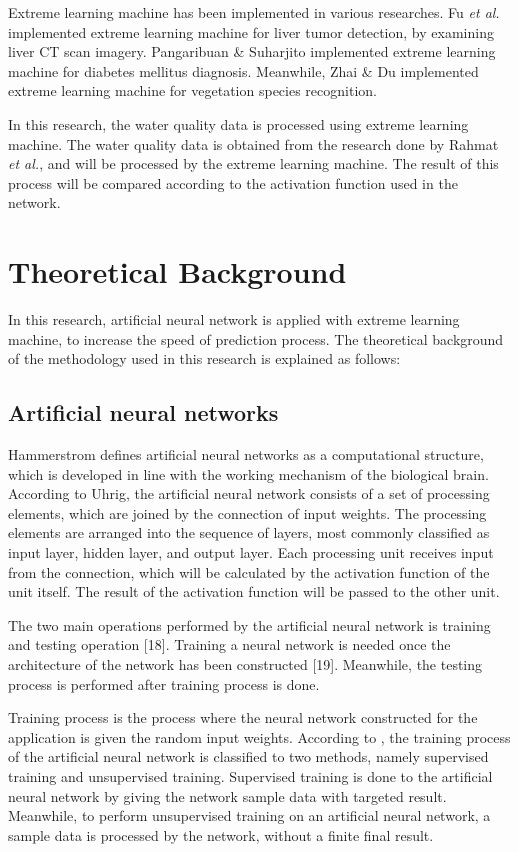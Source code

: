 \documentclass{ws-ijait}
\begin{document}
Extreme learning machine has been implemented in various researches. Fu \textit{et al.}\cite{13} implemented extreme learning machine for liver tumor detection, by examining liver CT scan imagery. Pangaribuan \& Suharjito\cite{14} implemented extreme learning machine for diabetes mellitus diagnosis. Meanwhile, Zhai \& Du\cite{15} implemented extreme learning machine for vegetation species recognition.

In this research, the water quality data is processed using extreme learning machine. The water quality data is obtained from the research done by Rahmat \textit{et al.}\cite{16}, and will be processed by the extreme learning machine. The result of this process will be compared according to the activation function used in the network.

\section{Theoretical Background}

In this research, artificial neural network is applied with extreme learning machine, to increase the speed of prediction process. The theoretical background of the methodology used in this research is explained as follows:

\subsection{Artificial neural networks}

Hammerstrom\cite{17} defines artificial neural networks as a computational structure, which is developed in line with the working mechanism of the biological brain. According to Uhrig\cite{18}, the artificial neural network consists of a set of processing elements, which are joined by the connection of input weights. The processing elements are arranged into the sequence of layers, most commonly classified as input layer, hidden layer, and output layer. Each processing unit receives input from the connection, which will be calculated by the activation function of the unit itself. The result of the activation function will be passed to the other unit.

The two main operations performed by the artificial neural network is training and testing operation [18]. Training a neural network is needed once the architecture of the network has been constructed [19]. Meanwhile, the testing process is performed after training process is done.

Training process is the process where the neural network constructed for the application is given the random input weights. According to \cite{20}, the training process of the artificial neural network is classified to two methods, namely supervised training and unsupervised training. Supervised training is done to the artificial neural network by giving the network sample data with targeted result. Meanwhile, to perform unsupervised training on an artificial neural network, a sample data is processed by the network, without a finite final result.
\end{document}
